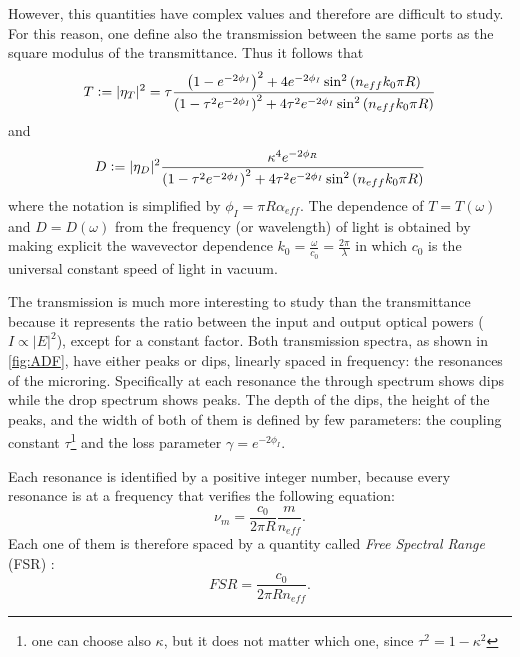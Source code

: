 However, this quantities have complex values and therefore are difficult to study.
For this reason, one define also the transmission between the same ports as the square modulus of the transmittance.
Thus it follows that
\begin{equation}
T \vcentcolon= |\eta_T|^2 = \tau 
\dfrac	{ \left( 1- 				e^{-2\phi_I} \right)^2 + 4 				e^{-2\phi_I} \sin^2 \left( n_{eff} k_0 \pi R \right) }
			{ \left( 1-\tau^2	e^{-2\phi_I} \right)^2 + 4 \tau^2	e^{-2\phi_I} \sin^2 \left( n_{eff} k_0 \pi R \right) }
\end{equation}
and
\begin{equation}
D \vcentcolon= |\eta_D|^2 
\dfrac	{ \kappa^4 e^{-2\phi_R}}
			{ \left( 1-\tau^2	e^{-2\phi_I} \right)^2 + 4 \tau^2	e^{-2\phi_I} \sin^2 \left( n_{eff} k_0 \pi R \right) }
\end{equation}
where the notation is simplified by $\phi_I = \pi R\alpha_{eff}$.
The dependence of $T=T(\omega)$ and $D=D(\omega)$ from the frequency (or wavelength) of light is obtained by making explicit the wavevector dependence $k_0=\frac{\omega}{c_0}=\frac{2\pi}{\lambda}$ in which $c_0$ is the universal constant speed of light in vacuum.

The transmission is much more interesting to study than the transmittance because it represents the ratio between the input and output optical powers ($I\propto |E|^2$), except for a constant factor.
Both transmission spectra, as shown in \autoref{fig:ADF}, have either peaks or dips, linearly spaced in frequency: the resonances of the microring.
Specifically at each resonance the through spectrum shows dips while the drop spectrum shows peaks.
The depth of the dips, the height of the peaks, and the width of both of them is defined by few parameters: the coupling constant $\tau$\footnote{one can choose also $\kappa$, but it does not matter which one, since $\tau^2 = 1-\kappa^2$} and the loss parameter $\gamma = e^{-2\phi_I}$.

Each resonance is identified by a positive integer number, because every resonance is at a frequency that verifies the following equation:
\begin{equation}
	\nu_m = \dfrac{c_0}{2\pi R} \dfrac{m}{n_{eff}} .
\end{equation}
Each one of them is therefore spaced by a quantity called \textit{Free Spectral Range} (FSR) :
\begin{equation}
	FSR = \dfrac{c_0}{2\pi R n_{eff}} .
\end{equation}

